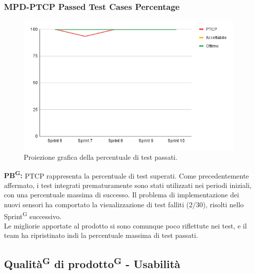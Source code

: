 \documentclass[8pt]{article}
\newcommand{\glossterm}[1]{#1\textsuperscript{G}} %
\begin{document}
\subsubsection{MPD-PTCP Passed Test Cases Percentage}
\begin{figure}[h!]
    \centering
    \includegraphics[width=1\textwidth]{images_pdq/PTCP.png}
    \caption{Proiezione grafica della percentuale di test passati.}
    \label{fig:Proiezione grafica della percentuale di test passati}
\end{figure}
\textbf{\glossterm{PB}:} PTCP rappresenta la percentuale di test superati. Come precedentemente affermato, i test integrati prematuramente sono stati utilizzati nei periodi iniziali, con una percentuale massima di successo. Il problema di implementazione dei nuovi sensori ha comportato la visualizzazione di test falliti (2/30), risolti nello \glossterm{Sprint} successivo.\\Le migliorie apportate al prodotto si sono comunque poco riflettute nei test, e il team ha ripristinato indi la percentuale massima di test passati.
\clearpage
\subsection{\glossterm{Qualità} di \glossterm{prodotto} - Usabilità}
\end{document}

